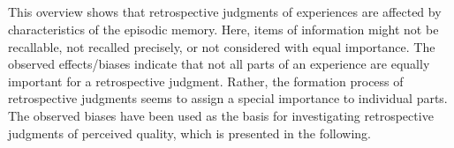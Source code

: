 \subparagraph*{}
This overview shows that retrospective judgments of experiences are affected by characteristics of the episodic memory.
Here, items of information might not be recallable, not recalled precisely, or not considered with equal importance.
The observed effects/biases indicate that not all parts of an experience are equally important for a retrospective judgment.
Rather, the formation process of retrospective judgments seems to assign a special importance to individual parts.
The observed biases have been used as the basis for investigating retrospective judgments of perceived quality, which is presented in the following.
